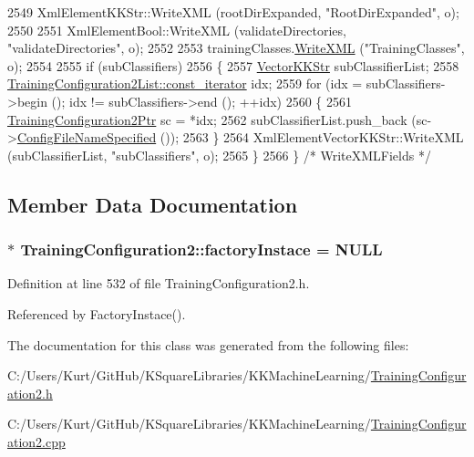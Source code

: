 \begin{DoxyCode}
2549     XmlElementKKStr::WriteXML (rootDirExpanded, \textcolor{stringliteral}{"RootDirExpanded"}, o);
2550   
2551   XmlElementBool::WriteXML (validateDirectories, \textcolor{stringliteral}{"validateDirectories"}, o);
2552 
2553   trainingClasses.\hyperlink{class_k_k_m_l_l_1_1_training_class_list_ace536ac9e1005f676dc9a1878b4552c0}{WriteXML} (\textcolor{stringliteral}{"TrainingClasses"}, o);
2554 
2555   \textcolor{keywordflow}{if}  (subClassifiers)
2556   \{
2557     \hyperlink{class_k_k_b_1_1_vector_k_k_str}{VectorKKStr}  subClassifierList;
2558     \hyperlink{class_k_k_b_1_1_k_k_queue_aeb057c9c010446f46f57c1e355f981f1}{TrainingConfiguration2List::const\_iterator}  idx;
2559     \textcolor{keywordflow}{for}  (idx = subClassifiers->begin (); idx != subClassifiers->end (); ++idx)
2560     \{
2561       \hyperlink{class_k_k_m_l_l_1_1_training_configuration2}{TrainingConfiguration2Ptr}  sc = *idx;
2562       subClassifierList.push\_back (sc->\hyperlink{class_k_k_m_l_l_1_1_training_configuration2_af8744817d3fe760c1d73912fb46fb8d0}{ConfigFileNameSpecified} ());
2563     \}
2564     XmlElementVectorKKStr::WriteXML (subClassifierList, \textcolor{stringliteral}{"subClassifiers"}, o);
2565   \}
2566 \}  \textcolor{comment}{/* WriteXMLFields */}
\end{DoxyCode}


\subsection{Member Data Documentation}
\subsubsection[{\texorpdfstring{factory\+Instace}{factoryInstace}}]{ $\ast$ Training\+Configuration2\+::factory\+Instace = N\+U\+LL\hspace{0.3cm}{\ttfamily [static]}}\hypertarget{class_k_k_m_l_l_1_1_training_configuration2_a864a70941c2e667264c3274340ce2862}{}\label{class_k_k_m_l_l_1_1_training_configuration2_a864a70941c2e667264c3274340ce2862}


Definition at line 532 of file Training\+Configuration2.\+h.



Referenced by Factory\+Instace().



The documentation for this class was generated from the following files\+:\begin{DoxyCompactItemize}
\item 
C\+:/\+Users/\+Kurt/\+Git\+Hub/\+K\+Square\+Libraries/\+K\+K\+Machine\+Learning/\hyperlink{_training_configuration2_8h}{Training\+Configuration2.\+h}\item 
C\+:/\+Users/\+Kurt/\+Git\+Hub/\+K\+Square\+Libraries/\+K\+K\+Machine\+Learning/\hyperlink{_training_configuration2_8cpp}{Training\+Configuration2.\+cpp}\end{DoxyCompactItemize}
